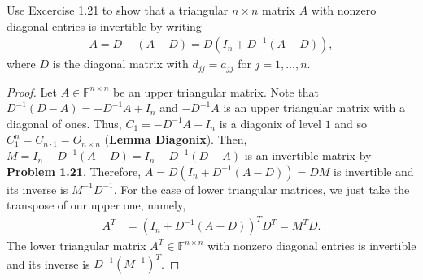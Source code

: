 \documentclass[12pt]{article}
\newenvironment{problem}[2][Problem]{\begin{trivlist} \item[\hskip \labelsep {\bfseries #1}\hskip \labelsep {\bfseries #2.}]}{\end{trivlist}}
\begin{document}
\begin{problem}{1.23}
  Use Excercise 1.21 to show that a triangular $n\times n$ matrix $A$ with nonzero diagonal entries is invertible by writing
\begin{align*}
  A= D+(A-D) = D(I_{n}+D^{-1}(A-D)),
\end{align*}
where $D$ is the diagonal matrix with $d_{jj} = a_{jj}$ for $j=1,\dots,n$. 
\begin{proof}
  Let $A\in \mathbb{F}^{n\times n}$ be an upper triangular matrix. Note that $D^{-1}(D-A) = -D^{-1}A+I_{n}$ and $-D^{-1}A$ is an upper triangular matrix with a diagonal of ones. Thus, $C_{1} = -D^{-1}A+I_{n}$ is a diagonix of level $1$ and so $C_{1}^{n} = C_{n\cdot 1}=O_{n\times n}$ (\textbf{Lemma Diagonix}). Then, $M = I_{n} + D^{-1}(A-D) = I_{n} - D^{-1}(D-A)$ is an invertible matrix by \textbf{Problem 1.21}. Therefore, $A=D(I_{n}+D^{-1}(A-D)) = DM$ is invertible and its inverse is $M^{-1}D^{-1}$. For the case of lower triangular matrices, we just take the transpose of our upper one, namely, 
\begin{align*}
  A^{T} &= (I_{n}+D^{-1}(A-D))^{T}D^{T} = M^{T}D.
\end{align*}
The lower triangular matrix $A^{T}\in \mathbb{F}^{n\times n}$ with nonzero diagonal entries is invertible and its inverse is $D^{-1}\left( M^{-1} \right)^{T}$.
\end{proof}
\end{problem}
\end{document}
